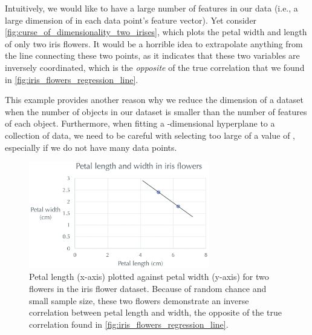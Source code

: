 Intuitively, we would like to have a large number of features in our data (i.e., a large dimension of  in each data point's feature vector). Yet consider \autoref{fig:curse_of_dimensionality_two_irises}, which plots the petal width and length of only two iris flowers. It would be a horrible idea to extrapolate anything from the line connecting these two points, as it indicates that these two variables are inversely coordinated, which is the \textit{opposite} of the true correlation that we found in \autoref{fig:iris_flowers_regression_line}.

This example provides another reason why we reduce the dimension of a dataset when the number of objects in our dataset is smaller than the number of features of each object. Furthermore, when fitting a -dimensional hyperplane to a collection of data, we need to be careful with selecting too large of a value of , especially if we do not have many data points. \\

\begin{figure}[h]
\centering
\mySfFamily
\includegraphics[width = 0.7\textwidth]{../images_CMYK/curse_of_dimensionality_two_irises}
\caption{Petal length (x-axis) plotted against petal width (y-axis) for two flowers in the iris flower dataset. Because of random chance and small sample size, these two flowers demonstrate an inverse correlation between petal length and width, the opposite of the true correlation found in \autoref{fig:iris_flowers_regression_line}.}
\label{fig:curse_of_dimensionality_two_irises}
\end{figure}

\begin{exercise}\end{exercise}

